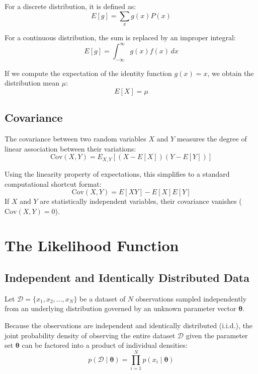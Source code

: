 \documentclass[11pt,a4paper]{article}
\begin{document}
For a discrete distribution, it is defined as:
\begin{equation}
E[g] = \sum_{x} g(x)P(x)
\end{equation}

For a continuous distribution, the sum is replaced by an improper integral:
\begin{equation}
E[g] = \int_{-\infty}^{\infty} g(x)f(x) \, dx
\end{equation}

If we compute the expectation of the identity function $g(x)=x$, we obtain the distribution mean $\mu$:
\begin{equation}
E[X] = \mu
\end{equation}

\subsection{Covariance}
The covariance between two random variables $X$ and $Y$ measures the degree of linear association between their variations:
\begin{equation}
\text{Cov}(X, Y) = E_{X,Y}\left[ (X - E[X])(Y - E[Y]) \right]
\end{equation}

Using the linearity property of expectations, this simplifies to a standard computational shortcut format:
\begin{equation}
\text{Cov}(X, Y) = E[XY] - E[X]E[Y]
\end{equation}
If $X$ and $Y$ are statistically independent variables, their covariance vanishes ($\text{Cov}(X, Y) = 0$).

\section{The Likelihood Function}
\subsection{Independent and Identically Distributed Data}
Let $\mathcal{D} = \{x_1, x_2, \dots, x_N\}$ be a dataset of $N$ observations sampled independently from an underlying distribution governed by an unknown parameter vector $\mathbf{\theta}$. 

Because the observations are independent and identically distributed (i.i.d.), the joint probability density of observing the entire dataset $\mathcal{D}$ given the parameter set $\mathbf{\theta}$ can be factored into a product of individual densities:
\begin{equation}
p(\mathcal{D} \mid \mathbf{\theta}) = \prod_{i=1}^{N} p(x_i \mid \mathbf{\theta})
\end{equation}
\end{document}
